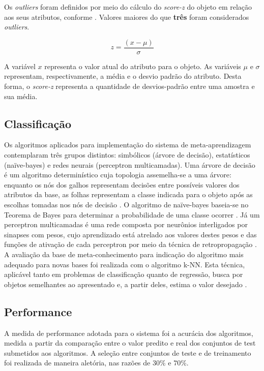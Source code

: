 \documentclass[runningheads]{llncs}
\begin{document}
Os \emph{outliers} foram definidos por meio do cálculo do \emph{score-z} do objeto em relação aos seus atributos, conforme \cite{kdd}. Valores maiores do que \textbf{três} foram considerados \emph{outliers}.

\begin{equation}
    z = \frac{(x - \mu)}{\sigma}
\end{equation}

A variável ${x}$ representa o valor atual do atributo para o objeto. As variáveis ${\mu}$ e ${\sigma}$ representam, respectivamente, a média e o desvio padrão do atributo. Desta forma, o \emph{score-z} representa a quantidade de desvios-padrão entre uma amostra e sua média.

\subsection{Classificação}

Os algoritmos aplicados para implementação do sistema de meta-aprendizagem contemplaram três grupos distintos: simbólicos (árvore de decisão), estatísticos (naïve-bayes) e redes neurais (perceptron multicamadas). Uma árvore de decisão é um algoritmo determinístico cuja topologia assemelha-se a uma árvore: enquanto os nós dos galhos representam decisões entre possíveis valores dos atributos da base, as folhas representam a classe indicada para o objeto após as escolhas tomadas nos nós de decisão \cite{kdd}. O algoritmo de naïve-bayes baseia-se no Teorema de Bayes para determinar a probabilidade de uma classe ocorrer \cite{kdd}. Já um perceptron multicamadas é uma rede composta por neurônios interligados por sinapses com pesos, cujo aprendizado está atrelado aos valores destes pesos e das funções de ativação de cada perceptron por meio da técnica de retropropagação \cite{kdd}. A avaliação da base de meta-conhecimento para indicação do algoritmo mais adequado para novas bases foi realizada com o algoritmo k-NN. Esta técnica, aplicável tanto em problemas de classificação quanto de regressão, busca por objetos semelhantes ao apresentado e, a partir deles, estima o valor desejado \cite{kdd}.

\subsection{Performance}

A medida de performance adotada para o sistema foi a acurácia dos algoritmos, medida a partir da comparação entre o valor predito e real dos conjuntos de test submetidos aos algoritmos. A seleção entre conjuntos de teste e de treinamento foi realizada de maneira aletória, nas razões de ${30\%}$ e ${70\%}$.
\end{document}
